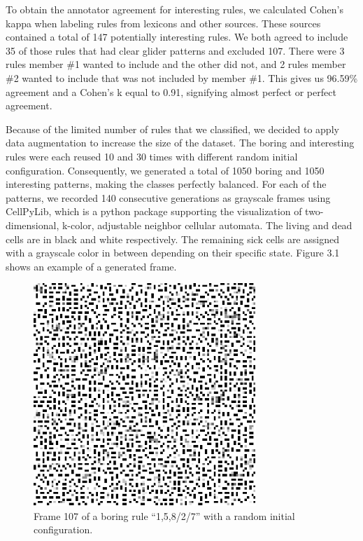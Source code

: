 \documentclass[12pt]{article}
\numberwithin{figure}{section} %
\begin{document}
To obtain the annotator agreement for interesting rules, we calculated Cohen’s kappa when labeling rules from lexicons and other sources. These sources contained a total of 147 potentially interesting rules. We both agreed to include 35 of those rules that had clear glider patterns and excluded 107. There were 3 rules member \#1 wanted to include and the other did not, and 2 rules member \#2 wanted to include that was not included by member \#1. This gives us 96.59\% agreement and a Cohen’s k equal to 0.91, signifying almost perfect or perfect agreement. 

Because of the limited number of rules that we classified, we decided to apply data augmentation to increase the size of the dataset. The boring and interesting rules were each reused 10 and 30 times with different random initial configuration. Consequently, we generated a total of 1050 boring and 1050 interesting patterns, making the classes perfectly balanced. For each of the patterns, we recorded 140 consecutive generations as grayscale frames using CellPyLib, which is a python package supporting the visualization of two-dimensional, k-color, adjustable neighbor cellular automata. The living and dead cells are in black and white respectively. The remaining sick cells are assigned with a grayscale color in between depending on their specific state. Figure 3.1 shows an example of a generated frame. 

\begin{figure}[H]
\centering
\includegraphics[width=0.5\linewidth]{Section3/1}
\caption{Frame 107 of a boring rule “1,5,8/2/7” with a random initial configuration. }
\vspace{-1.5em}
\end{figure}
\end{document}

